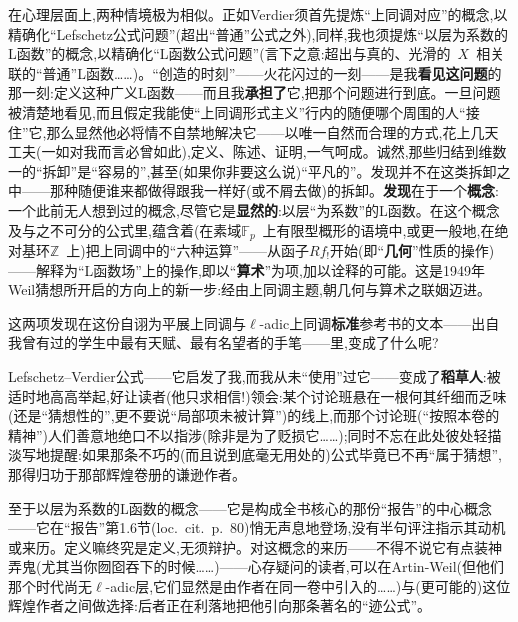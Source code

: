 在心理层面上,两种情境极为相似。正如Verdier须首先提炼“上同调对应”的概念,以精确化“Lefschetz公式问题”(超出“普通”公式之外),同样,我也须提炼“以层为系数的L函数”的概念,以\dmark{}精确化“L函数公式问题”(言下之意:超出与真的、光滑的~$X$~相关联的“普通”L函数……)。“创造的时刻”——火花闪过的一刻——是我\textbf{看见这问题}的那一刻:定义这种广义L函数——而且我\textbf{承担了}它,把那个问题进行到底。一旦问题被清楚地看见,而且假定我能使“上同调形式主义”行内的随便哪个周围的人“接住”它,那么显然他必将情不自禁地解决它——以唯一自然而合理的方式,花上几天工夫(一如对我而言必曾如此),定义、陈述、证明,一气呵成。诚然,那些归结到维数一的“拆卸”是“容易的”,甚至(如果你非要这么说)“平凡的”。发现并不在这类拆卸之中——那种随便谁来都做得跟我一样好(或不屑去做)的拆卸。\textbf{发现}在于一个\textbf{概念}:一个此前无人想到过的概念,尽管它是\textbf{显然的}:以层“为系数”的L函数。在这个概念及与之不可分的公式里,蕴含着(在素域$\mathbb{F}_p$~上有限型概形的语境中,或更一般地,在绝对基环$\mathbb{Z}$~上)把上同调中的“六种运算”——从函子$Rf_!$开始(即“\textbf{几何}”性质的操作)——解释为“L函数场”上的操作,即以“\textbf{算术}”为项,加以诠释的可能。这是1949年Weil猜想所开启的方向上的新一步:经由上同调主题,朝几何与算术之联姻迈进。

这两项发现在这份自诩为平展上同调与$\ell$-adic上同调\textbf{标准}参考书的文本——出自我曾有过的学生中最有天赋、最有名望者的手笔——里,变成了什么呢?

Lefschetz--Verdier公式——它启发了我,而我从未“使用”过它——变成了\textbf{稻草人}:被适时地高高举起,好让读者(他只求相信!)领会:某个讨论班悬在一根何其纤细而乏味(还是“猜想性的”,更不要说“局部项未被计算”)的线上,而那个讨论班(“按照本卷的精神”)人们善意地绝口不以指涉(除非是为了贬损它……);同时不忘在此处彼处轻描淡写地提醒:如果那条不巧的(而且说到底毫无用处的)公式毕竟已不再“属于猜想”,那得归功于那部辉煌卷册的谦逊作者。

至于以层为系数的L函数的概念——它是构成全书核心的那份“报告”的中心概念——它在“报告”第1.6节(loc.~cit.~p.~80)悄无声息地登场,没有半句评注指示其动机或来历。定义嘛终究是定义,无须辩护。对这概念的来历——不得不说它有点装神弄鬼(尤其当你囫囵吞下的时候……)——心存疑问的读者,可以在Artin-Weil(但他们那个时代尚无$\ell$-adic层,它们显然是由作者在同一卷中\dmark{}引入的……)与(更可能的)这位辉煌作者之间做选择:后者正在利落地把他引向那条著名的“迹公式”。

